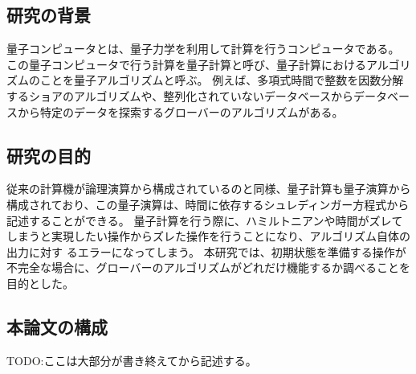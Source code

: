 \begin{comment}
    はじめに
\end{comment}


% 

\subsection{研究の背景}
量子コンピュータとは、量子力学を利用して計算を行うコンピュータである。
この量子コンピュータで行う計算を量子計算と呼び、量子計算におけるアルゴリズムのことを量子アルゴリズムと呼ぶ。
例えば、多項式時間で整数を因数分解するショアのアルゴリズムや、整列化されていないデータベースからデータベースから特定のデータを探索するグローバーのアルゴリズムがある。


\subsection{研究の目的}
従来の計算機が論理演算から構成されているのと同様、量子計算も量子演算から構成されており、この量子演算は、時間に依存するシュレディンガー方程式から記述することができる。
量子計算を行う際に、ハミルトニアンや時間がズレてしまうと実現したい操作からズレた操作を行うことになり、アルゴリズム自体の出力に対す るエラーになってしまう。
本研究では、初期状態を準備する操作が不完全な場合に、グローバーのアルゴリズムがどれだけ機能するか調べることを目的とした。
\subsection{本論文の構成}
TODO:ここは大部分が書き終えてから記述する。
